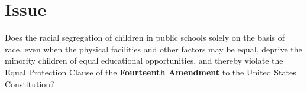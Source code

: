 \section{Issue}

\begin{tcolorbox}[issuebox]
  Does the racial segregation of children in public schools solely on the basis of race,
  even when the physical facilities and other  factors may be equal,
  deprive the minority children of equal educational opportunities, and thereby violate the
  Equal Protection Clause of the \textbf{Fourteenth Amendment} to the United States
  Constitution?
\end{tcolorbox}

